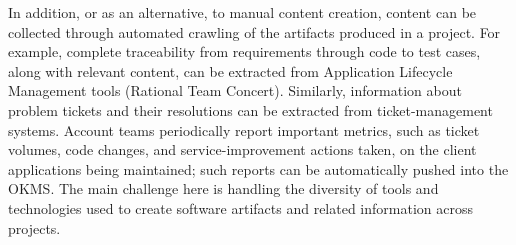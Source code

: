 
In addition, or as an alternative, to manual content creation, content can be
collected through automated crawling of the artifacts produced in a project. For
example, complete traceability from requirements through code to test cases,
along with relevant content, can be extracted from Application Lifecycle
Management tools (\eg Rational Team Concert). Similarly, information about
problem tickets and their resolutions can be extracted from ticket-management
systems.  Account teams periodically report important metrics, such as ticket
volumes, code changes, and service-improvement actions taken, on the client
applications being maintained; such reports can be automatically pushed into the
OKMS. The main challenge here is handling the diversity of tools and
technologies used to create software artifacts and related information across
projects.

